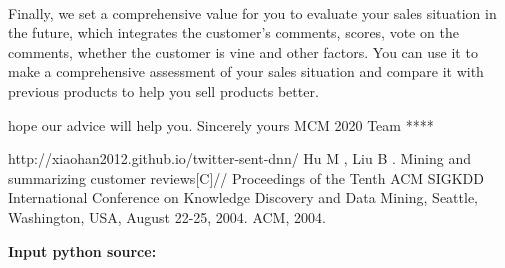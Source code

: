 \documentclass{mcmthesis}
\begin{document}
	\paragraph{}
	Finally, we set a comprehensive value for you to evaluate your sales situation in the future, which integrates the customer's comments, scores, vote on the comments, whether the customer is vine and other factors. You can use it to make a comprehensive assessment of your sales situation and compare it with previous products to help you sell products better.
	
	hope our advice will help you.
	\flushleft
	Sincerely yours
	\flushleft
	MCM 2020 Team ****
	
	\newpage
	
	\begin{thebibliography}{99}
		 http://xiaohan2012.github.io/twitter-sent-dnn/
		 Hu M , Liu B . Mining and summarizing customer reviews[C]// Proceedings of the Tenth ACM SIGKDD International Conference on Knowledge Discovery and Data Mining, Seattle, Washington, USA, August 22-25, 2004. ACM, 2004.
		
	\end{thebibliography}
	
	\newpage
	
	\begin{appendices}
		
 \textcolor[rgb]{0.98,0.00,0.00}{\textbf{Input python source:}}
		
		
	\end{appendices}
\end{document}
